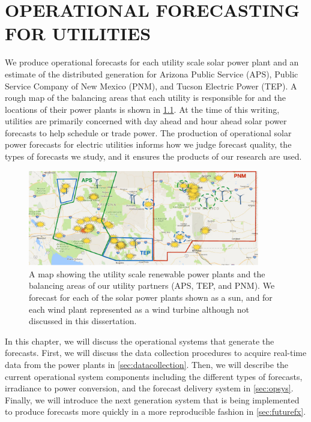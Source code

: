 \chapter{OPERATIONAL FORECASTING FOR UTILITIES}
\label{chap:operations}

We produce operational forecasts for each utility scale solar power
plant and an estimate of the distributed generation for Arizona Public
Service (APS), Public Service Company of New Mexico (PNM), and Tucson
Electric Power (TEP).
A rough map of the balancing areas that each utility is responsible
for and the locations of their power plants is shown in
\cref{fig:utilitymap}.
At the time of this writing, utilities are primarily concerned with
day ahead and hour ahead solar power forecasts to help schedule or
trade power.
The production of operational solar power forecasts for electric
utilities informs how we judge forecast quality, the types of
forecasts we study, and it ensures the products of our research are
used.

\begin{figure}[htb]
\centering
\includegraphics[width=0.9\textwidth]{figs/fxmap.pdf}
\caption[Map of utility scale renewable power plants]{A map showing
the utility scale renewable power plants and the balancing areas of
our utility partners (APS, TEP, and PNM). We forecast for each of the
solar power plants shown as a sun, and for each wind plant represented
as a wind turbine although not discussed in this dissertation.}
\label{fig:utilitymap}
\end{figure}

In this chapter, we will discuss the operational systems that generate
the forecasts.
First, we will discuss the data collection procedures to acquire
real-time data from the power plants in \cref{sec:datacollection}.
Then, we will describe the current operational system components
including the different types of forecasts, irradiance to power
conversion, and the forecast delivery system in \cref{sec:opsys}.
Finally, we will introduce the next generation system that is being
implemented to produce forecasts more quickly in a more reproducible
fashion in \cref{sec:futurefx}.

